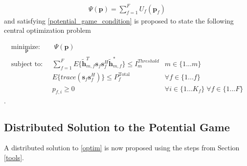 \documentclass[12pt,a4paper]{report}
\begin{document}
\begin{gather*} \label{Potential_Function}
\Psi(\mathbf{p}) = \sum_{f = 1}^{F} U_{f}(\mathbf{p}_{f})
\end{gather*}
and satisfying \eqref{potential_game_condition} is proposed to state the following central optimization problem
	
		\begin{subequations}
	\label{optim}
	\begin{align}
	    \underset{\mathbf{p}}{\text{minimize: }}
	    & \; \Psi(\mathbf{p}) \label{potential_game} \\
	    \text{subject to: } \; &
	  \sum^F_{f=1} E\{\mathbf{\tilde{h}}_{m,f}^T  \mathbf{s}_{f} 						
	\mathbf{s}_{f}^{H} \mathbf{\tilde{h}}_{m,f}^* \}\leq I^{Threshold}		
	_{m} & m \in \{1 ...m\} 
		\label{interference_const}\\
        & E\{trace(\mathbf{s}_f\mathbf{s}_f^H)\}  \leq P_{f}^{\text{Total}}  \label{power_const}
        & \forall f \in \{1 ... f\}\\
        & p_{f,i} \geq 0 &  \forall i \in \{1 ...K_{f}\} \; \forall f \in \{1 ... F\}\label{pos_power_const}
	\end{align}
	\end{subequations}.


\subsection{Distributed Solution to the Potential Game}
A distributed solution to \eqref{optim} is now proposed using the steps from Section \ref{tools}.
\end{document}
